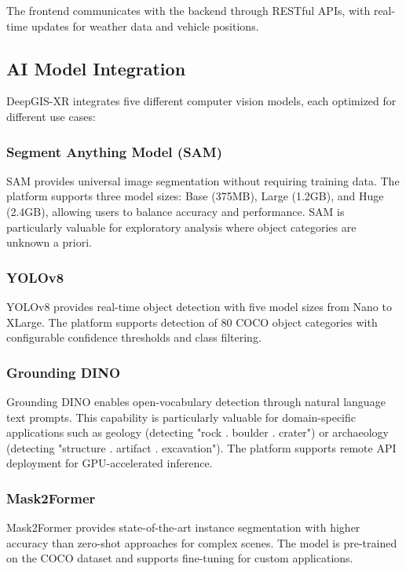 \documentclass[conference]{IEEEtran}
\begin{document}
The frontend communicates with the backend through RESTful APIs, with real-time updates for weather data and vehicle positions.

\subsection{AI Model Integration}

DeepGIS-XR integrates five different computer vision models, each optimized for different use cases:

\subsubsection{Segment Anything Model (SAM)}
SAM \cite{sam_ref} provides universal image segmentation without requiring training data. The platform supports three model sizes: Base (375MB), Large (1.2GB), and Huge (2.4GB), allowing users to balance accuracy and performance. SAM is particularly valuable for exploratory analysis where object categories are unknown a priori.

\subsubsection{YOLOv8}
YOLOv8 \cite{yolov8_ref} provides real-time object detection with five model sizes from Nano to XLarge. The platform supports detection of 80 COCO object categories with configurable confidence thresholds and class filtering.

\subsubsection{Grounding DINO}
Grounding DINO \cite{grounding_dino_ref} enables open-vocabulary detection through natural language text prompts. This capability is particularly valuable for domain-specific applications such as geology (detecting "rock . boulder . crater") or archaeology (detecting "structure . artifact . excavation"). The platform supports remote API deployment for GPU-accelerated inference.

\subsubsection{Mask2Former}
Mask2Former \cite{mask2former_ref} provides state-of-the-art instance segmentation with higher accuracy than zero-shot approaches for complex scenes. The model is pre-trained on the COCO dataset and supports fine-tuning for custom applications.
\end{document}
